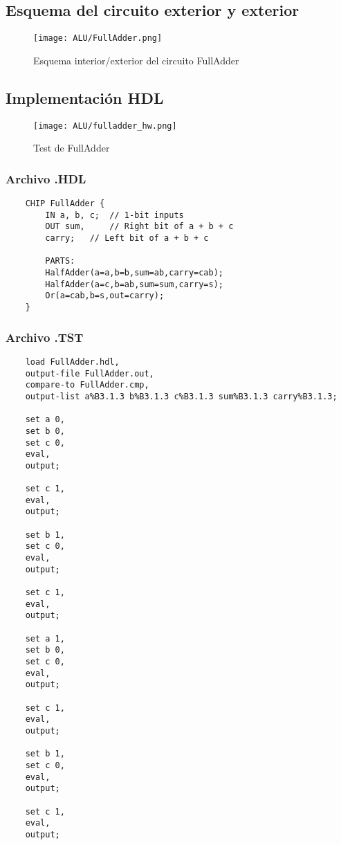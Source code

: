 \documentclass[12pt]{article}
\begin{document}
\subsection{Esquema del circuito exterior y exterior}
\begin{figure}[H]
	\centering
	\texttt{[image: ALU/FullAdder.png]}
	\caption{Esquema interior/exterior del circuito FullAdder}
	\label{fig:f_adder}
\end{figure}
\subsection{Implementación HDL}
\begin{figure}[H]
	\centering
	\texttt{[image: ALU/fulladder\_hw.png]}
	\caption{Test de FullAdder}
	\label{fig:enter-label}
\end{figure}
\subsubsection{Archivo .HDL}
\begin{lstlisting}
	CHIP FullAdder {
		IN a, b, c;  // 1-bit inputs
		OUT sum,     // Right bit of a + b + c
		carry;   // Left bit of a + b + c

		PARTS:
		HalfAdder(a=a,b=b,sum=ab,carry=cab);
		HalfAdder(a=c,b=ab,sum=sum,carry=s);
		Or(a=cab,b=s,out=carry);
	}
\end{lstlisting}
\subsubsection{Archivo .TST}
\begin{lstlisting}
	load FullAdder.hdl,
	output-file FullAdder.out,
	compare-to FullAdder.cmp,
	output-list a%B3.1.3 b%B3.1.3 c%B3.1.3 sum%B3.1.3 carry%B3.1.3;

	set a 0,
	set b 0,
	set c 0,
	eval,
	output;

	set c 1,
	eval,
	output;

	set b 1,
	set c 0,
	eval,
	output;

	set c 1,
	eval,
	output;

	set a 1,
	set b 0,
	set c 0,
	eval,
	output;

	set c 1,
	eval,
	output;

	set b 1,
	set c 0,
	eval,
	output;

	set c 1,
	eval,
	output;

\end{lstlisting}
\end{document}
